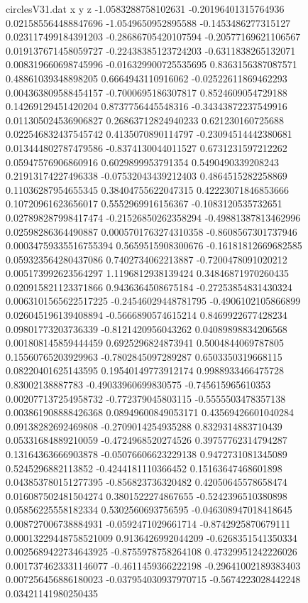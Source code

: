 \begin{filecontents}{circlesV31.dat}
x y z
-1.0583288758102631	-0.20196401315764936	0.021585564488847696
-1.0549650952895588	-0.1453486277315127	0.023117499184391203
-0.28686705420107594	-0.20577169621106567	0.019137671458059727
-0.22438385123724203	-0.6311838265132071	0.008319660698745996
-0.016329900725535695	0.8363156387087571	0.48861039348898205
0.6664943110916062	-0.02522611869462293	0.004363809588454157
-0.7000695186307817	0.8524609054729188	0.14269129451420204
0.8737756445548316	-0.34343872237549916	0.011305024536906827
0.26863712824940233	0.621230160725688	0.022546832437545742
0.4135070890114797	-0.23094514442380681	0.013444802787479586
-0.8374130044011527	0.6731231597212262	0.05947576906860916
0.6029899953791354	0.5490490339208243	0.21913174227496338
-0.07532043439212403	0.4864515282258869	0.11036287954655345
0.38404755622047315	0.42223071846853666	0.10720961623656017
0.5552969916156367	-0.1083120535732651	0.027898287998417474
-0.21526850262358294	-0.49881387813462996	0.02598286364490887
0.0005701763274310358	-0.8608567301737946	0.00034759335516755394
0.5659515908300676	-0.16181812669682585	0.059323564280437086
0.7402734062213887	-0.7200478091020212	0.005173992623564297
1.1196812938139424	0.34846871970260435	0.020915821123371866
0.9436364508675184	-0.27253854831430324	0.0063101565622517225
-0.24546029448781795	-0.4906102105866899	0.026045196139408894
-0.5666890574615214	0.8469922677428234	0.09801773203736339
-0.8121420956043262	0.04089898834206568	0.001808145859444459
0.6925296824873941	0.5004844069787805	0.15560765203929963
-0.7802845097289287	0.6503350319668115	0.08220401625143595
0.19540149773912174	0.9988933466475728	0.83002138887783
-0.49033960699830575	-0.745615965610353	0.002077137254958732
-0.772379045803115	-0.5555503478357138	0.003861908888426368
0.08949600849053171	0.43569426601040284	0.09138282692469808
-0.2709014254935288	0.8329314883710439	0.05331684889210059
-0.4724968520274526	0.39757762314794287	0.13164363666903878
-0.05076606623229138	0.9472731081345089	0.5245296882113852
-0.4244181110366452	0.15163647468601898	0.043853780151277395
-0.856823736320482	0.42050645578658474	0.016087502481504274
0.3801522274867655	-0.5242396510380898	0.05856225558182334
0.5302560693756595	-0.046308947018418645	0.008727006738884931
-0.0592471029661714	-0.8742925870679111	0.00013229448758521009
0.9136426992044209	-0.6268351541350334	0.0025689422734643925
-0.8755978758264108	0.47329951242226026	0.0017374623331146077
-0.4611459366222198	-0.29641002189383403	0.007256456886180023
-0.037954030937970715	-0.5674223028442248	0.03421141980250435

\end{filecontents}
